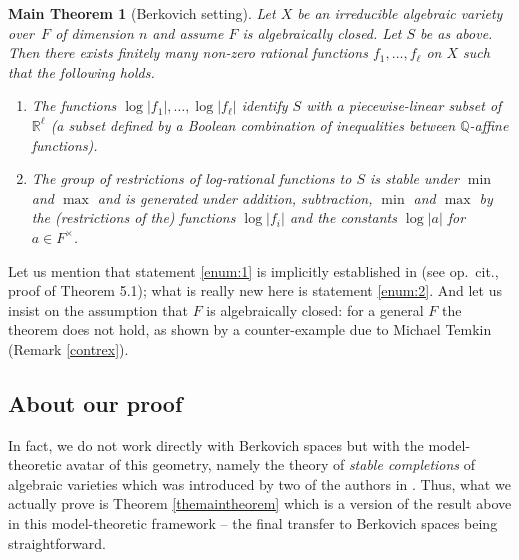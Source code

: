 \documentclass[JEP,XML,SOM,Unicode,ThmDefs,NoEqCountersInSection,published]{cedram}
\makeatletter
\newcommand{\opcit}{op.\@~cit.\@}
\newcommand{\abs}[1]{\mathopen|#1\mathclose|}
\newcommand{\Q}{\mathbb Q}
\newcommand{\R}{\mathbb R}
\theoremstyle{plain}
\newtheorem*{mtheo}{Main Theorem}
\theoremstyle{definition}
\makeatother
\begin{document}
\begin{mtheo}[Berkovich setting]
Let $X$ be an irreducible algebraic
variety over~$F$ of
dimension $n$ and assume $F$ is algebraically closed. Let $S$ be as above. Then there exists finitely many non-zero rational functions
$f_1,\ldots, f_\ell$ on $X$ such that the following holds.

\begin{enumerate}
\item\label{enum:1} The functions $\log \abs{f_1},\ldots, \log \abs{f_\ell}$ identify $S$
with a piecewise-linear subset of~$\R^\ell$ (\ie a
subset defined by a Boolean combination
of inequalities between $\Q$-affine functions).
\item\label{enum:2} The group of restrictions of log-rational functions to $S$
is stable under $\min$ and $\max$
and is generated
under addition, subtraction,
$\min$ and $\max$ by the (restrictions of the) functions $\log \abs{f_i}$ and the constants $\log \abs a$ for
$a\in F^\times$.
\end{enumerate}
\end{mtheo}
Let us mention that statement \eqref{enum:1} is
implicitly established in \cite{confluentes}
(see \opcit, proof of Theorem 5.1);
what is really new here is statement
\eqref{enum:2}. And let us insist on the assumption
that $F$ is algebraically closed:
for a general $F$ the theorem does
not hold, as shown by a
counter-example
due to Michael Temkin
(Remark \ref{contrex}).

\subsection{About our proof}\label{sec:about-proof}
In fact, we do not work directly with Berkovich spaces
but with the model-theoretic avatar of this geometry, namely the theory of \textit{stable completions} of algebraic varieties which was introduced by two of the authors in \cite{HL}.
Thus, what we actually prove is Theorem \ref{themaintheorem} which is a version of the result above in this model-theoretic framework -- the final transfer to Berkovich spaces being straightforward.
\end{document}
